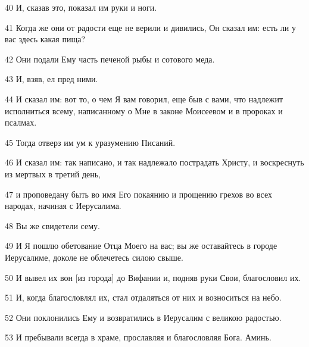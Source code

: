 \par 40 И, сказав это, показал им руки и ноги.
\par 41 Когда же они от радости еще не верили и дивились, Он сказал им: есть ли у вас здесь какая пища?
\par 42 Они подали Ему часть печеной рыбы и сотового меда.
\par 43 И, взяв, ел пред ними.
\par 44 И сказал им: вот то, о чем Я вам говорил, еще быв с вами, что надлежит исполниться всему, написанному о Мне в законе Моисеевом и в пророках и псалмах.
\par 45 Тогда отверз им ум к уразумению Писаний.
\par 46 И сказал им: так написано, и так надлежало пострадать Христу, и воскреснуть из мертвых в третий день,
\par 47 и проповедану быть во имя Его покаянию и прощению грехов во всех народах, начиная с Иерусалима.
\par 48 Вы же свидетели сему.
\par 49 И Я пошлю обетование Отца Моего на вас; вы же оставайтесь в городе Иерусалиме, доколе не облечетесь силою свыше.
\par 50 И вывел их вон [из города] до Вифании и, подняв руки Свои, благословил их.
\par 51 И, когда благословлял их, стал отдаляться от них и возноситься на небо.
\par 52 Они поклонились Ему и возвратились в Иерусалим с великою радостью.
\par 53 И пребывали всегда в храме, прославляя и благословляя Бога. Аминь.


